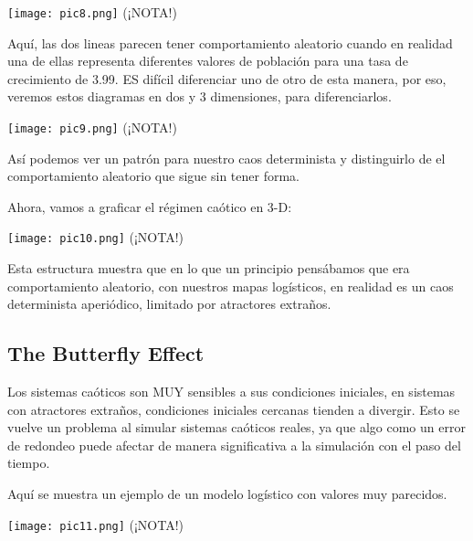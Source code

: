 \documentclass{article}
\begin{document}
\begin{center}
	\texttt{[image: pic8.png]}
    (¡NOTA!)
\end{center}
\vspace{0.3cm}

Aquí, las dos lineas parecen tener comportamiento aleatorio cuando en realidad una de ellas representa diferentes valores de población para una tasa de crecimiento de 3.99. ES difícil diferenciar uno de otro de esta manera, por eso, veremos estos diagramas en dos y 3 dimensiones, para diferenciarlos.

\begin{center}
	\texttt{[image: pic9.png]}
    (¡NOTA!)
\end{center}
\vspace{0.3cm}

Así podemos ver un patrón para nuestro caos determinista y distinguirlo de el comportamiento aleatorio que sigue sin tener forma.

\vspace{0.3cm}

Ahora, vamos a graficar el régimen caótico en 3-D:

\begin{center}
	\texttt{[image: pic10.png]}
    (¡NOTA!)
\end{center}
\vspace{0.3cm}

Esta estructura muestra que en lo que un principio pensábamos que era comportamiento aleatorio, con nuestros mapas logísticos, en realidad es un caos determinista aperiódico, limitado por atractores extraños.

\subsection{The Butterfly Effect}

Los sistemas caóticos son MUY sensibles a sus condiciones iniciales, en sistemas con atractores extraños, condiciones iniciales cercanas tienden a divergir. Esto se vuelve un problema al simular sistemas caóticos reales, ya que algo como un error de redondeo puede afectar de manera significativa a la simulación con el paso del tiempo. 

Aquí se muestra un ejemplo de un modelo logístico con valores muy parecidos.

\begin{center}
	\texttt{[image: pic11.png]}
    (¡NOTA!)
\end{center}
\vspace{0.3cm}
\end{document}
